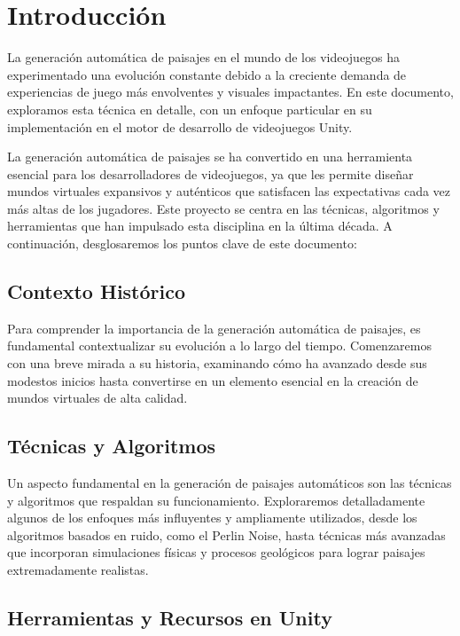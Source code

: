 \section{Introducción}

La generación automática de paisajes en el mundo de los videojuegos ha experimentado una evolución constante debido a la creciente demanda de experiencias de juego más envolventes y visuales impactantes. En este documento, exploramos esta técnica en detalle, con un enfoque particular en su implementación en el motor de desarrollo de videojuegos Unity.

La generación automática de paisajes se ha convertido en una herramienta esencial para los desarrolladores de videojuegos, ya que les permite diseñar mundos virtuales expansivos y auténticos que satisfacen las expectativas cada vez más altas de los jugadores. Este proyecto se centra en las técnicas, algoritmos y herramientas que han impulsado esta disciplina en la última década. A continuación, desglosaremos los puntos clave de este documento:

\subsection{Contexto Histórico}

Para comprender la importancia de la generación automática de paisajes, es fundamental contextualizar su evolución a lo largo del tiempo. Comenzaremos con una breve mirada a su historia, examinando cómo ha avanzado desde sus modestos inicios hasta convertirse en un elemento esencial en la creación de mundos virtuales de alta calidad.

\subsection{Técnicas y Algoritmos}

Un aspecto fundamental en la generación de paisajes automáticos son las técnicas y algoritmos que respaldan su funcionamiento. Exploraremos detalladamente algunos de los enfoques más influyentes y ampliamente utilizados, desde los algoritmos basados en ruido, como el Perlin Noise, hasta técnicas más avanzadas que incorporan simulaciones físicas y procesos geológicos para lograr paisajes extremadamente realistas.

\subsection{Herramientas y Recursos en Unity}


